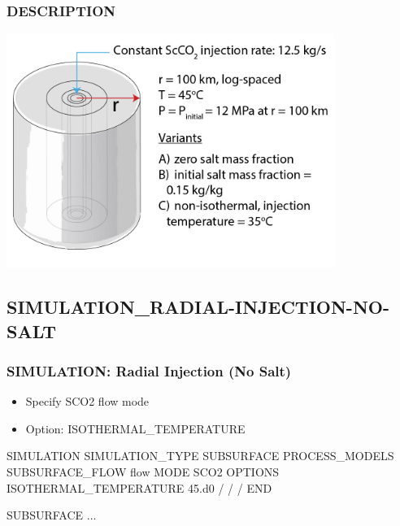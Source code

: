 \documentclass{beamer}
\begin{document}
\begin{frame}[fragile]\frametitle{DESCRIPTION}

\includegraphics[height=3in]{radial_inj_fig.jpg}

\end{frame}

\subsection{SIMULATION\_RADIAL-INJECTION-NO-SALT}

\begin{frame}[fragile]\frametitle{SIMULATION: Radial Injection (No Salt)}

\begin{itemize}
\item Specify SCO2 flow mode
\item Option: ISOTHERMAL\_TEMPERATURE
\end{itemize}


\begin{semiverbatim}

SIMULATION
  SIMULATION_TYPE SUBSURFACE
  PROCESS_MODELS
    SUBSURFACE_FLOW flow
      MODE SCO2
      OPTIONS
        ISOTHERMAL_TEMPERATURE 45.d0
      /
    /
  /
END

SUBSURFACE
...

\end{semiverbatim}

\end{frame}

\end{document}
